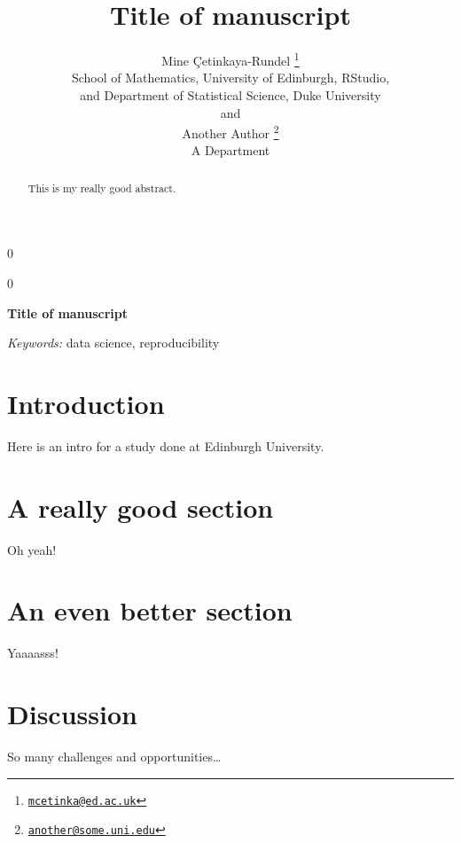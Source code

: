 \documentclass[12pt]{article}
\newcommand{\blind}{0}
\newcommand{\school}[1]{Edinburgh University}
\begin{document}
\def\spacingset#1{\renewcommand{\baselinestretch}%
{#1}\small\normalsize} \spacingset{1}



\blind
{
  \title{\bf Title of manuscript}

  \author{
        Mine \c{C}etinkaya-Rundel \footnote{\href{mailto:mcetinka@ed.ac.uk}{\nolinkurl{mcetinka@ed.ac.uk}}} \\
    School of Mathematics, University of Edinburgh, RStudio,\\
and Department of Statistical Science, Duke University\\
     and \\     Another Author \footnote{\href{mailto:another@some.uni.edu}{\nolinkurl{another@some.uni.edu}}} \\
    A Department\\
      }
  \maketitle
} \fi

\blind
{
  \bigskip
  \bigskip
  \bigskip
  \begin{center}
    {\LARGE\bf Title of manuscript}
  \end{center}
  \medskip
} \fi

\bigskip
\begin{abstract}
This is my really good abstract.
\end{abstract}

\noindent%
{\it Keywords:} data science, reproducibility
\vfill

\newpage
\spacingset{1.45} %

\hypertarget{introduction}{%
\section{Introduction}\label{introduction}}

Here is an intro for a study done at \school{}.

\hypertarget{a-really-good-section}{%
\section{A really good section}\label{a-really-good-section}}

Oh yeah! \citep{cetinkaya-rundel2018}

\hypertarget{an-even-better-section}{%
\section{An even better section}\label{an-even-better-section}}

Yaaaasss!

\hypertarget{discussion}{%
\section{Discussion}\label{discussion}}

So many challenges and opportunities\ldots{}

\newpage



\end{document}
